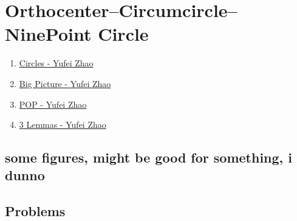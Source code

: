 \graphicspath{{Pics/}}


\newpage\section{Orthocenter--Circumcircle--NinePoint Circle}


\begin{enumerate} 
    \item \href{http://yufeizhao.com/olympiad/imo2008/zhao-circles.pdf}{Circles -
        Yufei Zhao}
    \item \href{http://yufeizhao.com/olympiad/cyclic_quad.pdf}{Big
        Picture - Yufei Zhao} \item
        \href{http://yufeizhao.com/olympiad/power_of_a_point.pdf}{POP - Yufei Zhao}
    \item \href{http://yufeizhao.com/olympiad/three_geometry_lemmas.pdf}{3 Lemmas
        - Yufei Zhao} 
\end{enumerate}


\subsection{some figures, might be good for something, i dunno}




\subsection{Problems}


\begin{minipage}{.3\textwidth} 
\end{minipage}\hfill%
\begin{minipage}{.65\textwidth} 


\end{minipage}








